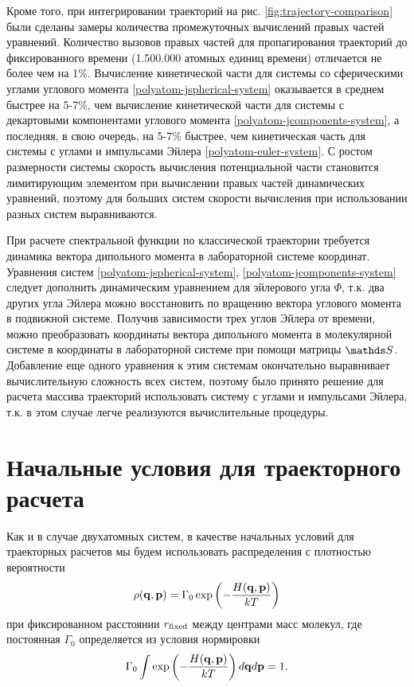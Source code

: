 Кроме того, при интегрировании траекторий на рис. \ref{fig:trajectory-comparison} были сделаны замеры количества промежуточных вычислений правых частей уравнений. Количество вызовов правых частей для пропагирования траекторий до фиксированного времени (1.500.000 атомных единиц времени) отличается не более чем на 1\%. Вычисление кинетической части для системы со сферическими углами углового момента \eqref{polyatom-jspherical-system} оказывается в среднем быстрее на 5-7\%, чем вычисление кинетической части для системы с декартовыми компонентами углового момента \eqref{polyatom-jcomponents-system}, а последняя, в свою очередь, на 5-7\% быстрее, чем кинетическая часть для системы с углами и импульсами Эйлера \eqref{polyatom-euler-system}. С ростом размерности системы скорость вычисления потенциальной части становится лимитирующим элементом при вычислении правых частей динамических уравнений, поэтому для больших систем скорости вычисления при использовании разных систем выравниваются. \par
При расчете спектральной функции по классической траектории требуется динамика вектора дипольного момента в лабораторной системе координат. Уравнения систем \eqref{polyatom-jspherical-system}, \eqref{polyatom-jcomponents-system} следует дополнить динамическим уравнением для эйлерового угла $\Phi$, т.к. два других угла Эйлера можно восстановить по вращению вектора углового момента в подвижной системе. Получив зависимости трех углов Эйлера от времени, можно преобразовать координаты вектора дипольного момента в молекулярной системе в координаты в лабораторной системе при помощи матрицы $\bbS$. Добавление еще одного уравнения к этим системам окончательно выравнивает вычислительную сложность всех систем, поэтому было принято решение для расчета массива траекторий использовать систему с углами и импульсами Эйлера, т.к. в этом случае легче реализуются вычислительные процедуры.

\section{Начальные условия для траекторного расчета}

Как и в случае двухатомных систем, в качестве начальных условий для траекторных расчетов мы будем использовать распределения с плотностью вероятности
\begin{gather}
    \rho(\mathbf{q}, \mathbf{p}) = \Gamma_0 \exp \left( -\frac{H(\mathbf{q}, \mathbf{p})}{kT} \right)
\end{gather}
%
при фиксированном расстоянии $r_\text{fixed}$ между центрами масс молекул, где постоянная $\Gamma_0$ определяется из условия нормировки
\begin{gather}
    \Gamma_0 \int \exp \left( -\frac{H(\mathbf{q}, \mathbf{p})}{k T} \right) d \mathbf{q} d\mathbf{p} = 1.
\end{gather}

